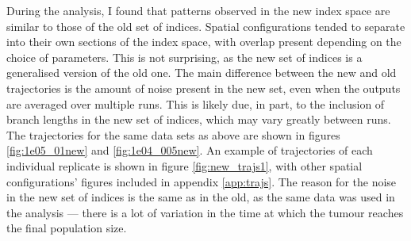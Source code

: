 During the analysis, I found that patterns observed in the new index space are
similar to those of the old set of indices. Spatial configurations tended to
separate into their own sections of the index space, with overlap present
depending on the choice of parameters. This is not surprising, as the new set
of indices is a generalised version of the old one. The main difference between
the new and old trajectories is the amount of noise present in the new set,
even when the outputs are averaged over multiple runs. This is likely due, in
part, to the inclusion of branch lengths in the new set of indices, which may
vary greatly between runs. The trajectories for the same data sets as above are
shown in figures \ref{fig:1e05_01new} and \ref{fig:1e04_005new}. An example of
trajectories of each individual replicate is shown in figure \ref{fig:new_trajs1},
with other spatial configurations' figures included in appendix \ref{app:trajs}.
The reason for the noise in
the new set of indices is the same as in the old, as the same data was used in
the analysis --- there is a lot of variation in the time at which the tumour
reaches the final population size.

